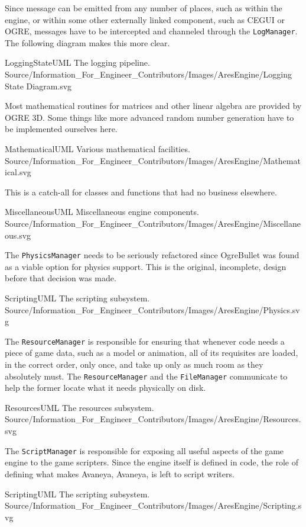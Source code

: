Since message can be emitted from any number of places, such as within the engine, or within some other externally linked component, such as CEGUI or OGRE, messages have to be intercepted and channeled through the {\tt LogManager}. The following diagram makes this more clear.

\FullPageLandscapeDiagram
    {LoggingStateUML}
    {The logging pipeline.}
    {Source/Information_For_Engineer_Contributors/Images/AresEngine/Logging State Diagram.svg}

\page 
{}
Most mathematical routines for matrices and other linear algebra are provided by OGRE 3D. Some things like more advanced random number generation have to be implemented ourselves here.

\FullPageLandscapeDiagram
    {MathematicalUML}
    {Various mathematical facilities.}
    {Source/Information_For_Engineer_Contributors/Images/AresEngine/Mathematical.svg}

\page 
{}
This is a catch-all for classes and functions that had no business elsewhere.

\FullPageLandscapeDiagram
    {MiscellaneousUML}
    {Miscellaneous engine components.}
    {Source/Information_For_Engineer_Contributors/Images/AresEngine/Miscellaneous.svg}

\page 
{}
The {\tt PhysicsManager} needs to be seriously refactored since OgreBullet was found as a viable option for physics support. This is the original, incomplete, design before that decision was made.

\FullPageLandscapeDiagram
    {ScriptingUML}
    {The scripting subsystem.}
    {Source/Information_For_Engineer_Contributors/Images/AresEngine/Physics.svg}

\page 
{}
The {\tt ResourceManager} is responsible for ensuring that whenever code needs a piece of game data, such as a model or animation, all of its requisites are loaded, in the correct order, only once, and take up only as much room as they absolutely must. The {\tt ResourceManager} and the {\tt FileManager} communicate to help the former locate what it needs physically on disk.

\FullPageLandscapeDiagram
    {ResourcesUML}
    {The resources subsystem.}
    {Source/Information_For_Engineer_Contributors/Images/AresEngine/Resources.svg}

\page 
{}
The {\tt ScriptManager} is responsible for exposing all useful aspects of the game engine to the game scripters. Since the engine itself is defined in code, the role of defining what makes Avaneya, Avaneya, is left to script writers.

\FullPageLandscapeDiagram
    {ScriptingUML}
    {The scripting subsystem.}
    {Source/Information_For_Engineer_Contributors/Images/AresEngine/Scripting.svg}

